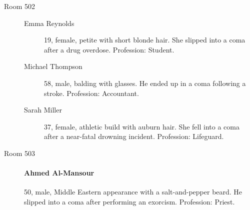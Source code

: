 \documentclass[bg-full]{resources/stylesheets/kult}
\begin{document}
\begin{description}
  \item[Room 502]
    \begin{description}
      \item[Emma Reynolds] 19, female, petite with short blonde hair. She slipped into a coma after a drug overdose. Profession: Student.
      \item[Michael Thompson] 58, male, balding with glasses. He ended up in a coma following a stroke. Profession: Accountant.
      \item[Sarah Miller] 37, female, athletic build with auburn hair. She fell into a coma after a near-fatal drowning incident. Profession: Lifeguard.
    \end{description}
  \item[Room 503]
      \paragraph{Ahmed Al-Mansour} 50, male, Middle Eastern appearance with a salt-and-pepper beard. He slipped into a coma after performing an exorcism. Profession: Priest.

\end{description}
\end{document}
